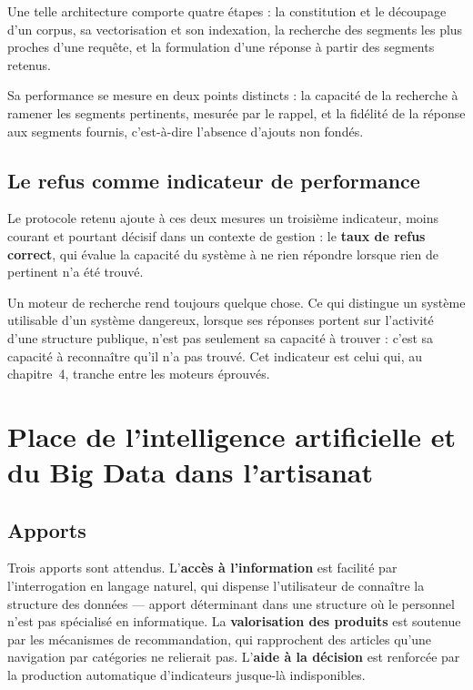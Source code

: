 Une telle architecture comporte quatre étapes : la constitution et le découpage d'un corpus, sa vectorisation et son indexation, la recherche des segments les plus proches d'une requête, et la formulation d'une réponse à partir des segments retenus.

Sa performance se mesure en deux points distincts : la capacité de la recherche à ramener les segments pertinents, mesurée par le rappel, et la fidélité de la réponse aux segments fournis, c'est-à-dire l'absence d'ajouts non fondés.

\subsection{Le refus comme indicateur de performance}

Le protocole retenu ajoute à ces deux mesures un troisième indicateur, moins courant et pourtant décisif dans un contexte de gestion : le \textbf{taux de refus correct}, qui évalue la capacité du système à ne rien répondre lorsque rien de pertinent n'a été trouvé.

Un moteur de recherche rend toujours quelque chose. Ce qui distingue un système utilisable d'un système dangereux, lorsque ses réponses portent sur l'activité d'une structure publique, n'est pas seulement sa capacité à trouver : c'est sa capacité à reconnaître qu'il n'a pas trouvé. Cet indicateur est celui qui, au chapitre~4, tranche entre les moteurs éprouvés.

\section{Place de l'intelligence artificielle et du Big Data dans l'artisanat}
\label{sec:1-4}

\subsection{Apports}

Trois apports sont attendus. L'\textbf{accès à l'information} est facilité par l'interrogation en langage naturel, qui dispense l'utilisateur de connaître la structure des données --- apport déterminant dans une structure où le personnel n'est pas spécialisé en informatique. La \textbf{valorisation des produits} est soutenue par les mécanismes de recommandation, qui rapprochent des articles qu'une navigation par catégories ne relierait pas. L'\textbf{aide à la décision} est renforcée par la production automatique d'indicateurs jusque-là indisponibles.

